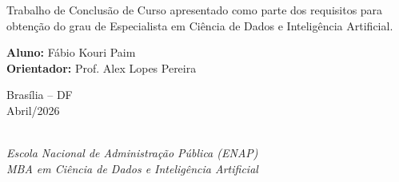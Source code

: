 \thispagestyle{coverpage}
\setlength{\parindent}{0pt}

\vspace*{2cm}

\begin{center}
\makeatletter
\textbf{\MakeUppercase{\@title}}
\makeatother
\end{center}

\vspace{2cm}

\hfill
\begin{minipage}{0.55\textwidth}
{%
Trabalho de Conclusão de Curso apresentado como parte dos requisitos
para obtenção do grau de Especialista em Ciência de Dados e
Inteligência Artificial.

\vspace{1cm}

\textbf{Aluno:} Fábio Kouri Paim\\
\textbf{Orientador:} Prof. Alex Lopes Pereira
\par}
\end{minipage}

\vfill

\begin{center}
Brasília -- DF\\
Abril/2026
\end{center}

\newpage

\thispagestyle{coverpage}

\begin{center}
\makeatletter
\textbf{\@title}
\makeatother

\vspace{0.8cm}

\makeatletter
\@author\\
\makeatother
\textit{Escola Nacional de Administração Pública (ENAP)}\\
\textit{MBA em Ciência de Dados e Inteligência Artificial}
\end{center}

\vspace{1cm}

